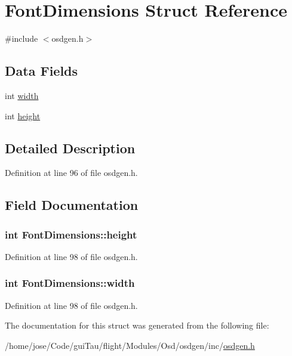 \hypertarget{struct_font_dimensions}{\section{Font\-Dimensions Struct Reference}
\label{struct_font_dimensions}
}


{\ttfamily \#include $<$osdgen.\-h$>$}

\subsection*{Data Fields}
\begin{DoxyCompactItemize}
\item 
int \hyperlink{struct_font_dimensions_a3a7f22c09ebeb18689a296fc7b72323e}{width}
\item 
int \hyperlink{struct_font_dimensions_a0a3e31e8b25bb8b85bbf0c92135deba7}{height}
\end{DoxyCompactItemize}


\subsection{Detailed Description}


Definition at line 96 of file osdgen.\-h.



\subsection{Field Documentation}
\hypertarget{struct_font_dimensions_a0a3e31e8b25bb8b85bbf0c92135deba7}{
\subsubsection[{height}]{\setlength{\rightskip}{0pt plus 5cm}int Font\-Dimensions\-::height}}\label{struct_font_dimensions_a0a3e31e8b25bb8b85bbf0c92135deba7}


Definition at line 98 of file osdgen.\-h.

\hypertarget{struct_font_dimensions_a3a7f22c09ebeb18689a296fc7b72323e}{
\subsubsection[{width}]{\setlength{\rightskip}{0pt plus 5cm}int Font\-Dimensions\-::width}}\label{struct_font_dimensions_a3a7f22c09ebeb18689a296fc7b72323e}


Definition at line 98 of file osdgen.\-h.



The documentation for this struct was generated from the following file\-:\begin{DoxyCompactItemize}
\item 
/home/jose/\-Code/gui\-Tau/flight/\-Modules/\-Osd/osdgen/inc/\hyperlink{osdgen_8h}{osdgen.\-h}\end{DoxyCompactItemize}
